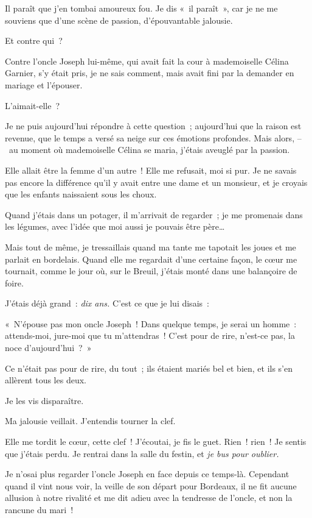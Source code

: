 \documentclass[french,twoside]{book} %
\begin{document}
Il paraît que j’en tombai amoureux fou. Je dis « il paraît », car je ne me souviens que d’une scène de passion, d’épouvantable jalousie.\par
Et contre qui ?\par
Contre l’oncle Joseph lui-même, qui avait fait la cour à mademoiselle Célina Garnier, s’y était pris, je ne sais comment, mais avait fini par la demander en mariage et l’épouser.\par
L’aimait-elle ?\par
Je ne puis aujourd’hui répondre à cette question ; aujourd’hui que la raison est revenue, que le temps a versé sa neige sur ces émotions profondes. Mais alors, – au moment où mademoiselle Célina se maria, j’étais aveuglé par la passion.\par
Elle allait être la femme d’un autre ! Elle me refusait, moi si pur. Je ne savais pas encore la différence qu’il y avait entre une dame et un monsieur, et je croyais que les enfants naissaient sous les choux.\par
Quand j’étais dans un potager, il m’arrivait de regarder ; je me promenais dans les légumes, avec l’idée que moi aussi je pouvais être père…\par
Mais tout de même, je tressaillais quand ma tante me tapotait les joues et me parlait en bordelais. Quand elle me regardait d’une certaine façon, le cœur me tournait, comme le jour où, sur le Breuil, j’étais monté dans une balançoire de foire.\par
J’étais déjà grand : \emph{dix ans.} C’est ce que je lui disais :\par
« N’épouse pas mon oncle Joseph ! Dans quelque temps, je serai un homme : attends-moi, jure-moi que tu m’attendras ! C’est pour de rire, n’est-ce pas, la noce d’aujourd’hui ? »\par
Ce n’était pas pour de rire, du tout ; ils étaient mariés bel et bien, et ils s’en allèrent tous les deux.\par
Je les vis disparaître.\par
Ma jalousie veillait. J’entendis tourner la clef.\par
Elle me tordit le cœur, cette clef ! J’écoutai, je fis le guet. Rien ! rien ! Je sentis que j’étais perdu. Je rentrai dans la salle du festin, et \emph{je bus pour oublier.}\par
Je n’osai plus regarder l’oncle Joseph en face depuis ce temps-là. Cependant quand il vint nous voir, la veille de son départ pour Bordeaux, il ne fit aucune allusion à notre rivalité et me dit adieu avec la tendresse de l’oncle, et non la rancune du mari !\par
\end{document}
